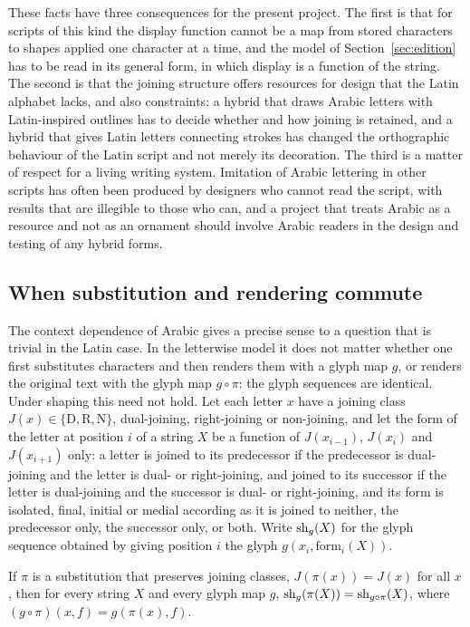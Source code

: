 These facts have three consequences for the present project. The first is that for scripts of this kind the display function cannot be a map from stored characters to shapes applied one character at a time, and the model of Section~\ref{sec:edition} has to be read in its general form, in which display is a function of the string. The second is that the joining structure offers resources for design that the Latin alphabet lacks, and also constraints: a hybrid that draws Arabic letters with Latin-inspired outlines has to decide whether and how joining is retained, and a hybrid that gives Latin letters connecting strokes has changed the orthographic behaviour of the Latin script and not merely its decoration. The third is a matter of respect for a living writing system. Imitation of Arabic lettering in other scripts has often been produced by designers who cannot read the script, with results that are illegible to those who can, and a project that treats Arabic as a resource and not as an ornament should involve Arabic readers in the design and testing of any hybrid forms.

\subsection{When substitution and rendering commute}

The context dependence of Arabic gives a precise sense to a question that is trivial in the Latin case. In the letterwise model it does not matter whether one first substitutes characters and then renders them with a glyph map $g$, or renders the original text with the glyph map $g\circ\pi$: the glyph sequences are identical. Under shaping this need not hold. Let each letter $x$ have a joining class $J(x)\in\{\mathrm D,\mathrm R,\mathrm N\}$, dual-joining, right-joining or non-joining, and let the form of the letter at position $i$ of a string $X$ be a function of $J(x_{i-1})$, $J(x_i)$ and $J(x_{i+1})$ only: a letter is joined to its predecessor if the predecessor is dual-joining and the letter is dual- or right-joining, and joined to its successor if the letter is dual-joining and the successor is dual- or right-joining, and its form is isolated, final, initial or medial according as it is joined to neither, the predecessor only, the successor only, or both. Write $\mathrm{sh}_g(X)$ for the glyph sequence obtained by giving position $i$ the glyph $g(x_i,\mathrm{form}_i(X))$.

\begin{proposition}\label{prop:commute}
If $\pi$ is a substitution that preserves joining classes, $J(\pi(x))=J(x)$ for all $x$, then for every string $X$ and every glyph map $g$, $\mathrm{sh}_g(\pi(X))=\mathrm{sh}_{g\circ\pi}(X)$, where $(g\circ\pi)(x,f)=g(\pi(x),f)$.
\end{proposition}

